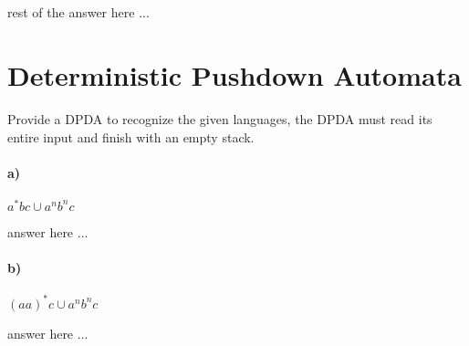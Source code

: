\documentclass[a4paper,12pt]{article}
\begin{document}
\begin{tcolorbox}
\\\\

rest of the answer here ...\\
\vspace{4cm} %
\end{tcolorbox}



\newpage
\section{Deterministic Pushdown Automata \hfill {}}
Provide a DPDA to recognize the given languages, the DPDA must read its entire input and finish with an empty stack.
\paragraph{a)} $a^*bc \cup a^nb^nc$ \\

\begin{tcolorbox}
answer here ...
\vspace{12cm} %
\end{tcolorbox}

\newpage

\paragraph{b)} $(aa)^*c \cup a^nb^nc$ \\

\begin{tcolorbox}
answer here ...
\vspace{12cm} %
\end{tcolorbox}
\end{document}
